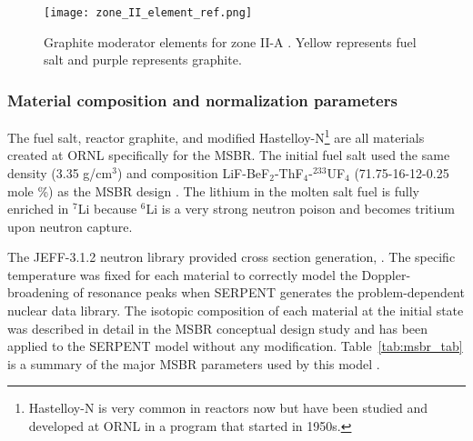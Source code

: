 \begin{figure}[ht!] %
  \texttt{[image: zone\_II\_element\_ref.png]}
  \caption{Graphite moderator elements for zone II-A 
  \cite{robertson_conceptual_1971,rykhlevskii_full-core_2017}.  Yellow 
  represents fuel salt and purple represents graphite.}
  \label{fig:II_element_ref}
\end{figure}

\subsubsection{Material composition and normalization parameters}
The fuel salt, reactor graphite, and modified Hastelloy-N\footnote{ 
Hastelloy-N is very common in reactors now but have been studied and developed 
at \gls{ORNL} in a program that started in 1950s.} 
are all materials created at \gls{ORNL} specifically for the \gls{MSBR}.
The initial fuel salt used the same 
density (3.35 g/cm$^3$) and composition LiF-BeF$_2$-ThF$_4$-$^{233}$UF$_4$ 
(71.75-16-12-0.25 mole \%) as the \gls{MSBR} design 
\cite{robertson_conceptual_1971}. The lithium in the molten salt fuel is fully 
enriched in $^{7}$Li because $^{6}$Li is a very strong neutron poison and 
becomes tritium upon neutron capture. 

The JEFF-3.1.2 neutron library provided cross section generation, 
\cite{oecd/nea_data_bank_jeff-3.1.2_2014}. 
The specific temperature was fixed 
for each material to correctly model the Doppler-broadening of resonance peaks 
when SERPENT generates the problem-dependent nuclear data library. The isotopic 
composition of each material at the initial state was described in detail in 
the MSBR conceptual design study \cite{robertson_conceptual_1971} and has been 
applied to the SERPENT model without any modification. Table~\ref{tab:msbr_tab} is 
a summary of the major \gls{MSBR} parameters used by this model 
\cite{robertson_conceptual_1971}. 

